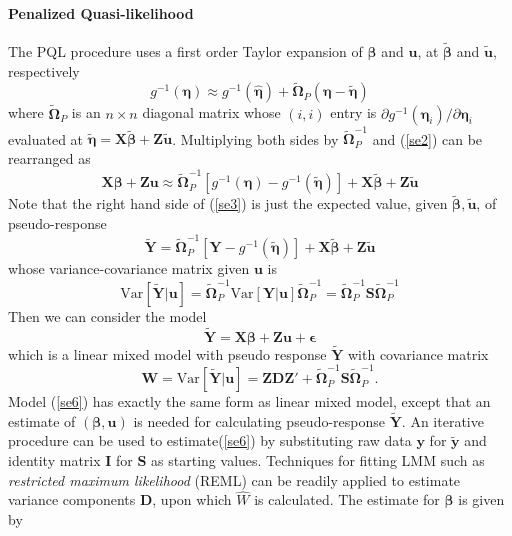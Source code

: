 		\paragraph{Penalized Quasi-likelihood}
		The PQL procedure uses a first order Taylor expansion of $\bm \beta$ and $\bm u$, at $\tilde{\bm \beta} $ and $ \tilde{\bm u} $, respectively
		\begin{equation}\label{se2}
		g^{-1}(\bm\eta) \approx g^{-1}(\hat{\bm \eta}) + \tilde{\bm \Omega}_P(\bm \eta-\tilde{\bm \eta})
		\end{equation} 
		where $\tilde{\bm \Omega}_P$ is an $n\times n$ diagonal matrix whose $(i, i)$ entry is  $\partial {g^{-1}(\bm \eta_i)}/\partial \bm \eta_i $ evaluated at $\tilde{\bm \eta}= \bm X\tilde{\bm \beta} + \bm Z\tilde{\bm u}$. Multiplying both sides by $\bm \tilde{\Omega}_P^{-1}$ and (\ref{se2}) can be rearranged as 
		\begin{equation}\label{se3}
		\bm {X\beta} + \bm {Zu} \approx \tilde{\bm \Omega}_P^{-1}[g^{-1}(\bm\eta)- g^{-1}(\tilde{\bm \eta})]  + \bm{X}\tilde{\bm \beta} + \bm Z\tilde{\bm u}
		\end{equation}
		Note that the right hand side of (\ref{se3}) is just the expected value, given $\tilde{\bm \beta}, \tilde{\bm u}$, of	 pseudo-response 
		\begin{equation}\label{se4}
		\tilde{\bm Y }=\tilde{\bm \Omega}_P^{-1}[\bm Y- g^{-1}(\tilde{\bm \eta})]  + \bm{X}\tilde{\bm \beta} + \bm Z\tilde{\bm u}
		\end{equation}
		whose variance-covariance matrix given $\bm u$ is 
		\begin{equation}\label{se5}
		\text{Var}[\tilde{\bm Y }|\bm u] =\tilde{\bm \Omega}_P^{-1} \text{Var}[\bm Y|\bm u]\tilde{\bm \Omega}_P^{-1} = 
		\tilde{\bm \Omega}_P^{-1} \bm S \tilde{\bm \Omega}_P^{-1}
		\end{equation}
		Then we can consider the model 
		\begin{equation}\label{se6}
		\tilde{\bm Y } = \bm{X\beta} + \bm {Zu}  + \bm \epsilon
		\end{equation}
		which is a linear mixed model with pseudo response $\tilde{\bm Y }$ with covariance matrix 
		\begin{equation}
		\bm W = \text{Var}[ \tilde{\bm Y } |\bm u] = \bm{ZDZ'} + \tilde{\bm \Omega}_P^{-1} \bm S \tilde{\bm \Omega}_P^{-1}.
		\end{equation}
		Model (\ref{se6})  has exactly the same form as linear mixed model, except that an estimate of $(\bm\beta, \bm u)$  is needed for calculating pseudo-response $\tilde{\bm Y }$. An iterative procedure can be used to estimate(\ref{se6}) by substituting raw data $\bm y$ for $\tilde{\bm y}$  and identity matrix $\bm I$ for $\bm S$ as starting values. Techniques for fitting LMM such as \textit{restricted maximum likelihood} (REML) can be readily applied to estimate variance components $\bm D$, upon which $\hat{W}$ is calculated. The estimate for $\bm \beta$ is given by
